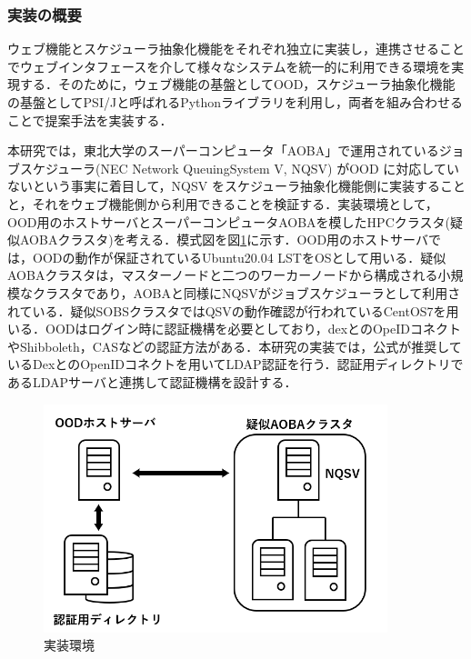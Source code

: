 \subsubsection{実装の概要}
ウェブ機能とスケジューラ抽象化機能をそれぞれ独立に実装し，連携させることでウェブインタフェースを介して様々なシステムを統一的に利用できる環境を実現する．そのために，ウェブ機能の基盤としてOOD，スケジューラ抽象化機能の基盤としてPSI/J\cite{cite5}と呼ばれるPythonライブラリを利用し，両者を組み合わせることで提案手法を実装する．\par
本研究では，東北大学のスーパーコンピュータ「AOBA」で運用されているジョブスケジューラ(NEC Network QueuingSystem V, NQSV) がOOD に対応していないという事実に着目して，NQSV をスケジューラ抽象化機能側に実装することと，それをウェブ機能側から利用できることを検証する．実装環境として，OOD用のホストサーバとスーパーコンピュータAOBAを模したHPCクラスタ(疑似AOBAクラスタ)を考える．模式図を図\ref{fig7}に示す．OOD用のホストサーバでは，OODの動作が保証されているUbuntu20.04 LSTをOSとして用いる．疑似AOBAクラスタは，マスターノードと二つのワーカーノードから構成される小規模なクラスタであり，AOBAと同様にNQSVがジョブスケジューラとして利用されている．疑似SOBSクラスタではQSVの動作確認が行われているCentOS7を用いる．OODはログイン時に認証機構を必要としており，dexとのOpeIDコネクトやShibboleth，CASなどの認証方法がある．本研究の実装では，公式が推奨しているDexとのOpenIDコネクトを用いてLDAP認証を行う\cite{cite7}\cite{cite8}．認証用ディレクトリであるLDAPサーバと連携して認証機構を設計する．\par

\begin{figure}[tb]
    \centering
    \includegraphics[width=100mm]{./fig/environment.png}
    \caption{実装環境}
    \label{fig7}
\end{figure}


